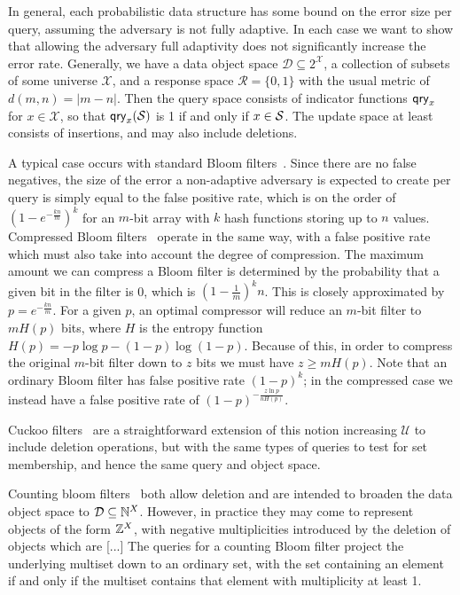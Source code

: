 In general, each probabilistic data structure has some bound on the error size per query, assuming the adversary is not fully adaptive. In each case we want to show that allowing the adversary full adaptivity does not significantly increase the error rate. Generally, we have a data object space $\mathcal{D} \subseteq 2^\mathcal{X}$, a collection of subsets of some universe $\mathcal{X}$, and a response space $\mathcal{R} = \{0,1\}$ with the usual metric of $d(m,n) = |m-n|$. Then the query space consists of indicator functions $\mathsf{qry}_x$ for $x \in \mathcal{X}$, so that $\mathsf{qry}_x(\mathcal{S})$ is 1 if and only if $x \in \mathcal{S}$. The update space at least consists of insertions, and may also include deletions.

A typical case occurs with standard Bloom filters~\cite{bloomfilter}. Since there are no false negatives, the size of the error a non-adaptive adversary is expected to create per query is simply equal to the false positive rate, which is on the order of $(1-e^{-\frac{kn}{m}})^k$ for an $m$-bit array with $k$ hash functions storing up to $n$ values. Compressed Bloom filters~\cite{xxx} operate in the same way, with a false positive rate which must also take into account the degree of compression. The maximum amount we can compress a Bloom filter is determined by the probability that a given bit in the filter is 0, which is $\left(1-\frac{1}{m}\right)^kn$. This is closely approximated by $p = e^{-\frac{kn}{m}}$. For a given $p$, an optimal compressor will reduce an $m$-bit filter to $mH(p)$ bits, where $H$ is the entropy function $H(p) = -p\log p - (1-p)\log(1-p)$. Because of this, in order to compress the original $m$-bit filter down to $z$ bits we must have $z \ge mH(p)$. Note that an ordinary Bloom filter has false positive rate $(1-p)^k$; in the compressed case we instead have a false positive rate of $(1-p)^{-\frac{z \ln p}{nH(p)}}$.

Cuckoo filters~\cite{xxx} are a straightforward extension of this notion increasing $\mathcal{U}$ to include deletion operations, but with the same types of queries to test for set membership, and hence the same query and object space.

Counting bloom filters~\cite{xxx} both allow deletion and are intended to broaden the data object space to $\mathcal{D} \subseteq \mathbb{N}^X$. However, in practice they may come to represent objects of the form $\mathbb{Z}^X$, with negative multiplicities introduced by the deletion of objects which are [...] The queries for a counting Bloom filter project the underlying multiset down to an ordinary set, with the set containing an element if and only if the multiset contains that element with multiplicity at least 1.

